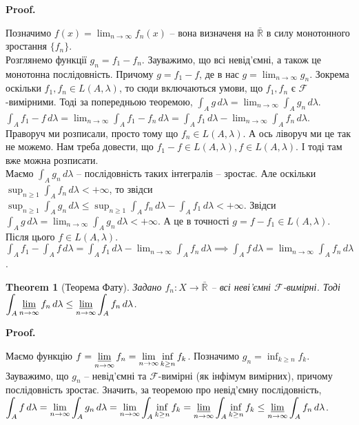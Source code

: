 \documentclass[a4paper, 10pt]{article}
\makeatletter
\theoremstyle{theoremdd}
\newtheorem{theorem}{Theorem}[subsection]
\renewenvironment{proof}[1][Proof.\\]{\par
\pushQED{\hfill \qed}%
\normalfont \topsep6\p@\@plus6\p@\relax
\trivlist
\item\relax
{\bfseries
#1\@addpunct{.}}\hspace\labelsep\ignorespaces
}{%
\popQED\endtrivlist\@endpefalse
}
\makeatother
\begin{document}
\begin{proof}
Позначимо $f(x) = \displaystyle\lim_{n \to \infty} f_n(x)$ -- вона визначеня на $\bar{\mathbb{R}}$ в силу монотонного зростання $\{f_n\}$.\\
Розглянемо функції $g_n = f_1 - f_n$. Зауважимо, що всі невід'ємні, а також це монотонна послідовність. Причому $g = f_1 - f$, де в нас $g = \displaystyle\lim_{n \to \infty} g_n$. Зокрема оскільки $f_1,f_n \in L(A,\lambda)$, то сюди включаються умови, що $f_1,f_n$ є $\mathcal{F}$-вимірними. Тоді за попередньою теоремою, $\displaystyle\int_A g\,d\lambda = \lim_{n \to \infty}\int_A g_n\,d\lambda$.\\
$\displaystyle\int_A f_1 - f\,d\lambda = \lim_{n \to \infty}\int_A f_1 - f_n\,d\lambda = \int_A f_1\,d\lambda - \lim_{n \to \infty} \int_A f_n\,d\lambda$.\\
Праворуч ми розписали, просто тому що $f_n \in L(A,\lambda)$. А ось ліворуч ми це так не можемо. Нам треба довести, що $f_1 - f \in L(A,\lambda), f \in L(A,\lambda)$. І тоді там вже можна розписати.\\
Маємо $\displaystyle\int_A g_n\,d\lambda$ -- послідовність таких інтегралів -- зростає. Але оскільки $\displaystyle\sup_{n \geq 1} \int_A f_n\,d\lambda < +\infty$, то звідси $\displaystyle\sup_{n \geq 1} \int_A g_n\,d\lambda \leq \sup_{n \geq 1} \int_A f_n\,d\lambda - \int_A f_1\,d\lambda < +\infty$. Звідси $\displaystyle\int_A g\,d\lambda = \lim_{n \to \infty} \int_A g_n\,d\lambda < +\infty$. А це в точності $g = f - f_1 \in L(A,\lambda)$. Після цього $f \in L(A,\lambda)$.\\
$\displaystyle\int_A f_1 - \int_A f\,d\lambda = \int_A f_1\,d\lambda - \lim_{n \to \infty} \int_A f_n\,d\lambda \implies \int_A f\,d\lambda = \lim_{n \to \infty} \int_A f_n\,d\lambda$.
\end{proof}

\begin{theorem}[Теорема Фату]
Задано $f_n \colon X \to \bar{\mathbb{R}}$ -- всі неві'ємні $\mathcal{F}$-вимірні. Тоді $\displaystyle\int_A \varliminf_{n \to \infty} f_n\,d\lambda \leq \varliminf_{n \to \infty} \int_A f_n\,d\lambda$.
\end{theorem}

\begin{proof}
Маємо функцію $f = \displaystyle\varliminf_{n \to \infty} f_n = \lim_{n \to \infty} \inf_{k \geq n} f_k$. Позначимо $g_n = \displaystyle\inf_{k \geq n} f_k$. Зауважимо, що $g_n$ -- невід'ємні та $\mathcal{F}$-вимірні (як інфімум вимірних), причому послідовність зростає. Значить, за теоремою про невід'ємну послідовність, \\ $\displaystyle\int_A f\,d\lambda = \lim_{n \to \infty} \int_A g_n\,d\lambda = \lim_{n \to \infty} \int_A \inf_{k \geq n} f_k = \varliminf_{n \to \infty} \int_A \inf_{k \geq n} f_k \leq \varliminf_{n \to \infty} \int_A f_n\,d\lambda$.
\end{proof}
\end{document}
